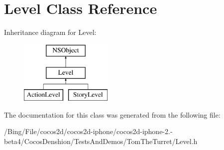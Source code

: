 \hypertarget{interface_level}{\section{Level Class Reference}
\label{interface_level}
}
Inheritance diagram for Level\-:\begin{figure}[H]
\begin{center}
\leavevmode
\includegraphics[height=3.000000cm]{interface_level}
\end{center}
\end{figure}


The documentation for this class was generated from the following file\-:\begin{DoxyCompactItemize}
\item 
/\-Bing/\-File/cocos2d/cocos2d-\/iphone/cocos2d-\/iphone-\/2.-\/beta4/\-Cocos\-Denshion/\-Tests\-And\-Demos/\-Tom\-The\-Turret/Level.\-h\end{DoxyCompactItemize}

